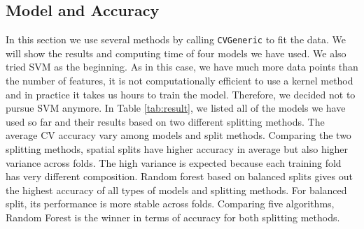 \documentclass[letterpaper,11pt]{article}
\begin{document}
\subsection{Model and Accuracy}
In this section we use several methods by calling \verb|CVGeneric| to fit the data. We will show the results and computing time of four models we have used. We also tried SVM as the beginning. As in this case, we have much more data points than the number of features, it is not computationally efficient to use a kernel method and in practice it takes us hours to train the model. Therefore, we decided not to pursue SVM anymore. In Table \ref{tab:result}, we listed all of the models we have used so far and their results based on two different splitting methods. The average CV accuracy vary among models and split methods. Comparing the two splitting methods, spatial splits have higher accuracy in average but also higher variance across folds. The high variance is expected because each training fold has very different composition. Random forest based on balanced splits gives out the highest accuracy of all types of models and splitting methods. For balanced split, its performance is more stable across folds. Comparing five algorithms, Random Forest is the winner in terms of accuracy for both splitting methods.  
\end{document}
